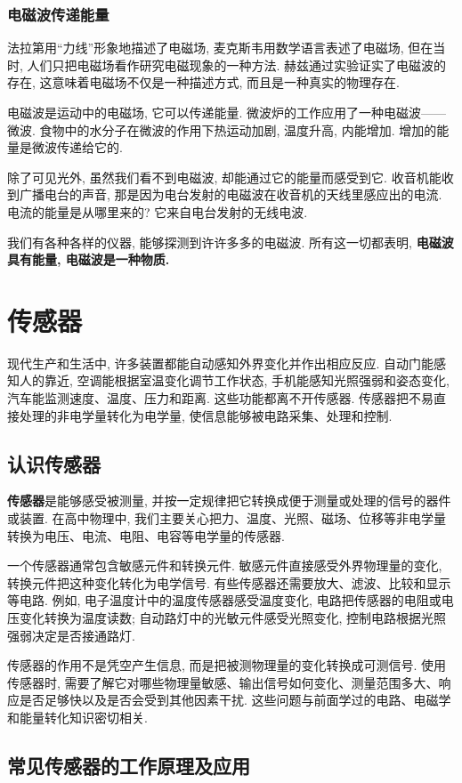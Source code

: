 \documentclass[UTF8,openany,fontset=fandol]{ctexbook}
\theoremstyle{chinesetextbook}
\begin{document}
\subsection{电磁波传递能量}
法拉第用“力线”形象地描述了电磁场, 麦克斯韦用数学语言表述了电磁场, 但在当时, 人们只把电磁场看作研究电磁现象的一种方法. 赫兹通过实验证实了电磁波的存在, 这意味着电磁场不仅是一种描述方式, 而且是一种真实的物理存在.

电磁波是运动中的电磁场, 它可以传递能量. 微波炉的工作应用了一种电磁波——微波. 食物中的水分子在微波的作用下热运动加剧, 温度升高, 内能增加. 增加的能量是微波传递给它的.

除了可见光外, 虽然我们看不到电磁波, 却能通过它的能量而感受到它. 收音机能收到广播电台的声音, 那是因为电台发射的电磁波在收音机的天线里感应出的电流. 电流的能量是从哪里来的? 它来自电台发射的无线电波.

我们有各种各样的仪器, 能够探测到许许多多的电磁波. 所有这一切都表明, \textbf{电磁波具有能量, 电磁波是一种物质.}
\chapter{传感器}
现代生产和生活中, 许多装置都能自动感知外界变化并作出相应反应. 自动门能感知人的靠近, 空调能根据室温变化调节工作状态, 手机能感知光照强弱和姿态变化, 汽车能监测速度、温度、压力和距离. 这些功能都离不开传感器. 传感器把不易直接处理的非电学量转化为电学量, 使信息能够被电路采集、处理和控制.
\section{认识传感器}
\textbf{传感器}是能够感受被测量, 并按一定规律把它转换成便于测量或处理的信号的器件或装置. 在高中物理中, 我们主要关心把力、温度、光照、磁场、位移等非电学量转换为电压、电流、电阻、电容等电学量的传感器.

一个传感器通常包含敏感元件和转换元件. 敏感元件直接感受外界物理量的变化, 转换元件把这种变化转化为电学信号. 有些传感器还需要放大、滤波、比较和显示等电路. 例如, 电子温度计中的温度传感器感受温度变化, 电路把传感器的电阻或电压变化转换为温度读数; 自动路灯中的光敏元件感受光照变化, 控制电路根据光照强弱决定是否接通路灯.

传感器的作用不是凭空产生信息, 而是把被测物理量的变化转换成可测信号. 使用传感器时, 需要了解它对哪些物理量敏感、输出信号如何变化、测量范围多大、响应是否足够快以及是否会受到其他因素干扰. 这些问题与前面学过的电路、电磁学和能量转化知识密切相关.
\section{常见传感器的工作原理及应用}
\end{document}
